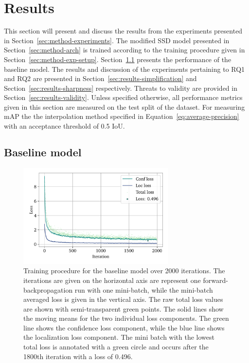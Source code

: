 \chapter{Results}\label{cha:results}

This section will present and discuss the results from the experiments presented in Section~\ref{sec:method-experiments}.
The modified SSD model presented in Section~\ref{sec:method-arch} is trained according to the training procedure given in Section~\ref{sec:method-exp-setup}.
Section~\ref{sec:results-baseline} presents the performance of the baseline model. 
The results and discussion of the experiments pertaining to RQ1 and RQ2 are presented in Section~\ref{sec:results-simplification} and Section~\ref{sec:results-sharpness} respectively.
Threats to validity are provided in Section~\ref{sec:results-validity}.
Unless specified otherwise, all performance metrics given in this section are measured on the test split of the dataset.
For measuring mAP the the interpolation method specified in Equation~\ref{eq:average-precision} with an acceptance threshold of 0.5 IoU.

\section{Baseline model}\label{sec:results-baseline}
\begin{figure}[htbp]
    \centering
    \includegraphics[width=0.7\textwidth]{figs/results/baseline/loss2.pdf}
    \caption[Baseline training procedure]{%
Training procedure for the baseline model over 2000 iterations.
The iterations are given on the horizontal axis are represent one forward-backpropagation run with one mini-batch, while the mini-batch averaged loss is given in the vertical axis.
The raw total loss values are shown with semi-transparent green points.
The solid lines show the moving means for the two individual loss components.
The green line shows the confidence loss component, while the blue line shows the localization loss component.
The mini batch with the lowest total loss is annotated with a green circle and occurs after the 1800th iteration with a loss of 0.496.
    }\label{fig:method-baseline-loss}
  \end{figure}

